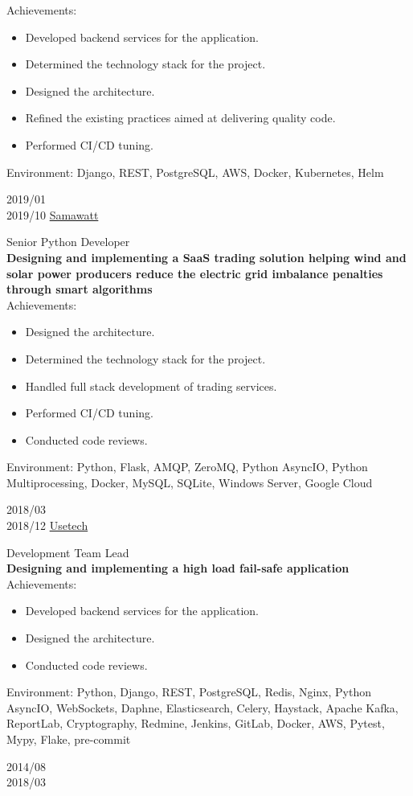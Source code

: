 \begin{entrylist}
{Achievements:
\begin{itemize}
\item Developed backend services for the application.
\item Determined the technology stack for the project.
\item Designed the architecture.
\item Refined the existing practices aimed at delivering quality code.
\item Performed CI/CD tuning.
\end{itemize}
Environment: Django, REST, PostgreSQL, AWS, Docker, Kubernetes, Helm}
\entry
{2019/01\\2019/10}
{\href{https://samawatt.com/}{Samawatt}}
{}
{Senior Python Developer\\
\textbf{Designing and implementing a SaaS trading solution helping wind and solar power producers reduce the electric grid imbalance penalties through smart algorithms}\\
Achievements:
\begin{itemize}
\item Designed the architecture.
\item Determined the technology stack for the project.
\item Handled full stack development of trading services.
\item Performed CI/CD tuning.
\item Conducted code reviews.
\end{itemize}
Environment: Python, Flask, AMQP, ZeroMQ, Python AsyncIO, Python Multiprocessing, Docker, MySQL, SQLite, Windows Server, Google Cloud}
\entry
{2018/03\\2018/12}
{\href{https://usetech.com}{Usetech}}
{}
{Development Team Lead\\
\textbf{Designing and implementing a high load fail-safe application}\\
Achievements:
\begin{itemize}
\item Developed backend services for the application.
\item Designed the architecture.
\item Conducted code reviews.
\end{itemize}
Environment: Python, Django, REST, PostgreSQL, Redis, Nginx, Python AsyncIO, WebSockets, Daphne, Elasticsearch, Celery, Haystack, Apache Kafka, ReportLab, Cryptography, Redmine, Jenkins, GitLab, Docker, AWS, Pytest, Mypy, Flake, pre-commit}
\entry
{2014/08\\2018/03}

\end{entrylist}
